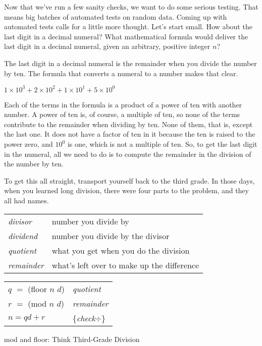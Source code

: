 Now that we've run a few sanity checks, we want to do some serious testing.
That means big batches of automated tests on random data.
Coming up with automated tests calls for a little more thought.
Let's start small. How about the last digit in a decimal numeral?
What mathematical formula would deliver the last digit in a
decimal numeral, given an arbitrary, positive integer $n$?

The last digit in a decimal numeral is the remainder when you divide
the number by ten. The formula that converts a numeral to a number
makes that clear.
\begin{center}
$1 \times 10^3 + 2 \times 10^2 + 1 \times 10^1 + 5 \times 10^0$
\end{center}

Each of the terms in the formula is a product of a power
of ten with another number. A power of ten is, of course,
a multiple of ten, so none of the terms contribute to the remainder
when dividing by ten. None of them, that is, except the last one.
It does not have a factor of ten in it because the ten is raised to the
power zero, and $10^0$ is one, which is not a multiple of ten.
So, to get the last digit in the numeral, all we need to do is to
compute the remainder in the division of the number by ten.

\begin{aside}
To get this all straight,
transport yourself back to the third grade.
In those days, when you learned long division,
there were four parts to the problem,
and they all had names.

\begin{tabular}{ll}
\emph{divisor}   & number you divide by \\
\emph{dividend}  & number you divide by the divisor \\
\emph{quotient}  & what you get when you do the division \\
\emph{remainder} & what's left over to make up the difference
\end{tabular}
\begin{center}
\begin{tabular}{ll}
$q$ $=$ (floor $n$ $d$) & \emph{quotient}  \\
$r$ $=$ (mod $n$ $d$)   & \emph{remainder} \\
$n = qd + r$            & \{\emph{check}$\div$\} \\
\end{tabular}
\end{center}
\caption{mod and floor: Think Third-Grade Division}
\label{third-grade-division}
\end{aside}

